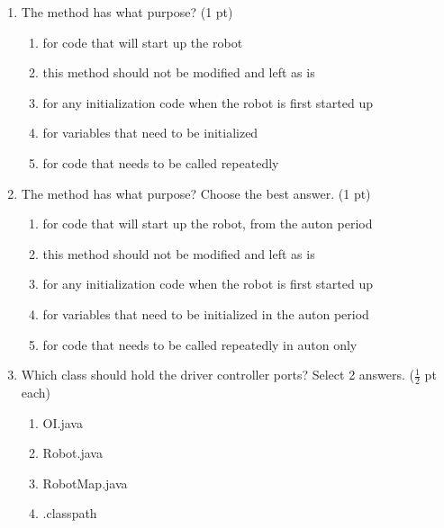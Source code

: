 \documentclass[11pt,fleqn]{article}
\begin{document}
\begin{enumerate}

\item The method  has what purpose? (1 pt)
	\begin{enumerate}
    	\item for code that will start up the robot
    	\item this method should not be modified and left as is
    	\item for any initialization code when the robot is first started up
    	\item for variables that need to be initialized
    	\item for code that needs to be called repeatedly
	\end{enumerate}

\item The method  has what purpose? Choose the best answer. (1 pt)
	\begin{enumerate}
    	\item for code that will start up the robot, from the auton period
    	\item this method should not be modified and left as is
    	\item for any initialization code when the robot is first started up
    	\item for variables that need to be initialized in the auton period
    	\item for code that needs to be called repeatedly in auton only
	\end{enumerate}

\item Which class should hold the driver controller ports? Select 2 answers. ($\frac{1}{2}$ pt each)
	\begin{enumerate}
    	\item OI.java
    	\item Robot.java
    	\item RobotMap.java
    	\item .classpath
	\end{enumerate}

\newpage


\end{enumerate}
\end{document}
